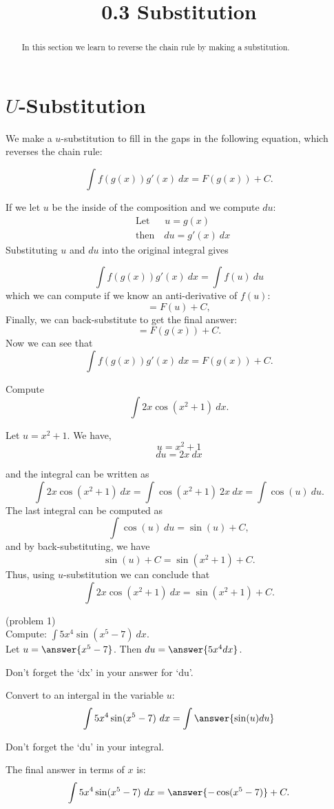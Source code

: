 \documentclass[handout]{ximera}
\title{0.3 Substitution}
\begin{document}
\begin{abstract}
In this section we learn to reverse the chain rule by making a substitution.
\end{abstract}

\maketitle

\section{$U$-Substitution}

We make a $u$-substitution to fill in the gaps in the following equation, which reverses the chain rule:

\[\int f(g(x))g'(x) \ dx = F(g(x)) + C. \]

If we let $u$ be the inside of the composition and we compute $du$:
 \begin{align*}
 &\text{Let} \quad \;\;u  = g(x) \\
 &\text{then} \quad du = g'(x) \ dx
 \end{align*}
 Substituting $u$ and $du$ into the original integral gives

\[\int f(g(x))g'(x) \ dx = \int f(u) \ du \]
which we can compute if we know an anti-derivative of $f(u)$:
\[=F(u) + C,\]
Finally, we can back-substitute to get the final answer:
\[=F(g(x)) + C. \]
Now we can see that
\[\int f(g(x))g'(x) \ dx = F(g(x)) + C. \]



\begin{example}[example 1]
Compute 
\[\int 2x\cos(x^2 + 1) \ dx.\]

Let $u = x^2 + 1$.  We have,
\[u = x^2 + 1\]
\[du = 2x \ dx\]

and the integral can be written as 
\[\int 2x\cos(x^2 + 1) \ dx = \int \cos(x^2 + 1) \ 2x\  dx = \int \cos(u) \ du.\]
The last integral can be computed as 
\[\int \cos(u) \ du = \sin(u) + C,\]
and by back-substituting, we have 
\[\sin(u) + C = \sin(x^2 + 1) + C.\]
Thus, using $u$-substitution we can conclude that
\[\int 2x\cos(x^2 + 1) \ dx =  \sin(x^2 + 1) + C.\]
\end{example}



\begin{problem}(problem 1)\\ Compute: $\displaystyle{\int 5x^4\sin(x^5 -7) \ dx}$.\\
Let $u = \answer{x^5 - 7}$. Then $du = \answer{5x^4 dx}$.\\
\begin{hint}
Don't forget the `dx' in your answer for `du'.
\end{hint}
Convert to an intergal in the variable $u$:
\[\int 5x^4\sin(x^5 -7) \ dx = \int\answer{\sin(u) du}\]
\begin{hint}
Don't forget the `du' in your integral.
\end{hint}
The final answer in terms of $x$ is:
\[\int 5x^4\sin(x^5 -7) \ dx = \answer{-\cos(x^5 -7)} +C.\]
\end{problem}
\end{document}

